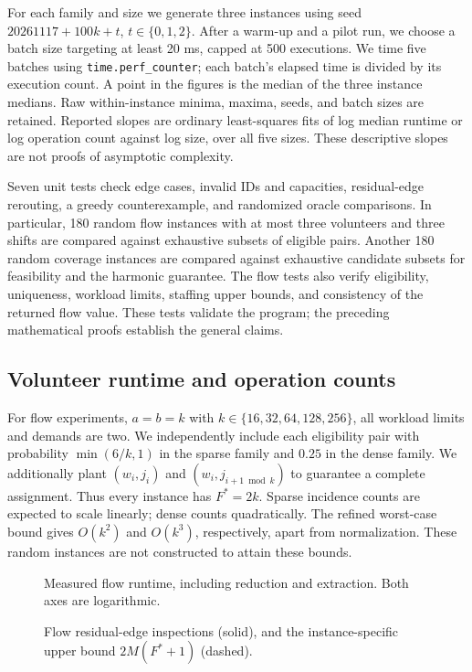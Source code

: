 \documentclass[sigconf,nonacm]{acmart}
\begin{document}
For each family and size we generate three instances using seed
$20261117+100k+t$, $t\in\{0,1,2\}$. After a warm-up and a pilot run,
we choose a batch size targeting at least 20 ms, capped at 500 executions.
We time five batches using \texttt{time.perf\_counter}; each batch's elapsed
time is divided by its execution count. A point in the figures is the median
of the three instance medians. Raw within-instance minima, maxima, seeds,
and batch sizes are retained. Reported slopes are ordinary least-squares
fits of log median runtime or log operation count against log size, over all
five sizes. These descriptive slopes are not proofs of asymptotic complexity.

Seven unit tests check edge cases, invalid IDs and capacities, residual-edge
rerouting, a greedy counterexample, and randomized oracle comparisons. In
particular, 180 random flow instances with at most three volunteers and
three shifts are compared against exhaustive subsets of eligible pairs.
Another 180 random coverage instances are compared against exhaustive
candidate subsets for feasibility and the harmonic guarantee. The flow tests
also verify eligibility, uniqueness, workload limits, staffing upper bounds,
and consistency of the returned flow value. These tests validate the program;
the preceding mathematical proofs establish the general claims.

\subsection{Volunteer runtime and operation counts}
For flow experiments, $a=b=k$ with
$k\in\{16,32,64,128,256\}$, all workload limits and demands are two.
We independently include each eligibility pair with probability
$\min(6/k,1)$ in the sparse family and $0.25$ in the dense family.
We additionally plant $(w_i,j_i)$ and $(w_i,j_{i+1\bmod k})$ to guarantee
a complete assignment. Thus every instance has $F^*=2k$. Sparse incidence
counts are expected to scale linearly; dense counts quadratically. The refined
worst-case bound gives $O(k^2)$ and $O(k^3)$, respectively, apart from
normalization. These random instances are not constructed to attain these
bounds.

\begin{figure}[t]
\centering
\caption{Measured flow runtime, including reduction and extraction.
Both axes are logarithmic.}\label{fig:flowtime}
\end{figure}
\begin{figure}[t]
\centering
\caption{Flow residual-edge inspections (solid), and the instance-specific
upper bound $2M(F^*+1)$ (dashed).}\label{fig:flowops}
\end{figure}
\end{document}
